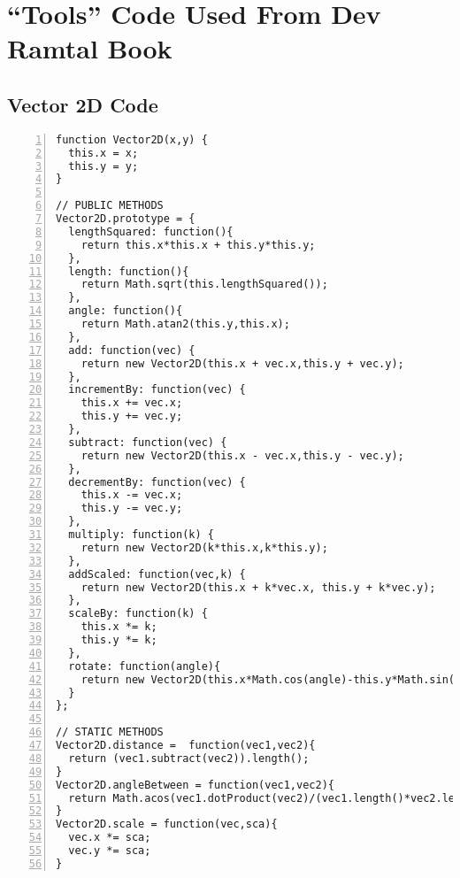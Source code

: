
\chapter{``Tools'' Code Used From Dev Ramtal Book} %

\label{AppendixD} %



\section{Vector 2D Code}
\begin{lstlisting}[breaklines=true, frame=single, numbers=left, caption=Vector code used to find various calculations of vectors]
function Vector2D(x,y) {
  this.x = x;
  this.y = y;   
}   

// PUBLIC METHODS 
Vector2D.prototype = {    
  lengthSquared: function(){
    return this.x*this.x + this.y*this.y;
  },
  length: function(){
    return Math.sqrt(this.lengthSquared());
  },  
  angle: function(){
    return Math.atan2(this.y,this.x);
  },  
  add: function(vec) {
    return new Vector2D(this.x + vec.x,this.y + vec.y);
  },
  incrementBy: function(vec) {
    this.x += vec.x;
    this.y += vec.y;
  },    
  subtract: function(vec) {
    return new Vector2D(this.x - vec.x,this.y - vec.y);
  },
  decrementBy: function(vec) {
    this.x -= vec.x;
    this.y -= vec.y;
  },    
  multiply: function(k) {
    return new Vector2D(k*this.x,k*this.y);
  },    
  addScaled: function(vec,k) {
    return new Vector2D(this.x + k*vec.x, this.y + k*vec.y);
  },  
  scaleBy: function(k) {
    this.x *= k;
    this.y *= k;
  },
  rotate: function(angle){
    return new Vector2D(this.x*Math.cos(angle)-this.y*Math.sin(angle),this.x*Math.sin(angle)+this.y*Math.cos(angle));
  } 
};    

// STATIC METHODS
Vector2D.distance =  function(vec1,vec2){
  return (vec1.subtract(vec2)).length(); 
}
Vector2D.angleBetween = function(vec1,vec2){
  return Math.acos(vec1.dotProduct(vec2)/(vec1.length()*vec2.length()));
}
Vector2D.scale = function(vec,sca){
  vec.x *= sca;
  vec.y *= sca;
}
\end{lstlisting}

